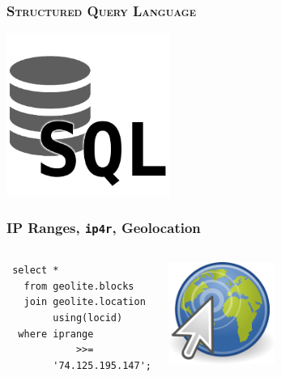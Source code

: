 \documentclass{beamer}
\begin{document}
\begin{frame}
  \frametitle{\textsc{Structured Query Language}}

  \begin{center}
    \includegraphics[height=2.1in]{sql.png}
  \end{center}
\end{frame}

\begin{frame}[fragile]
  \frametitle{IP Ranges, \texttt{ip4r}, Geolocation}

  \vfill

\begin{columns}
\begin{verbatim}
 select *
   from geolite.blocks
   join geolite.location
        using(locid)
  where iprange
            >>=
        '74.125.195.147';
\end{verbatim}
\begin{center}
  \includegraphics[height=9em]{geolocation-clic.png}
\end{center}
\end{columns}
\end{frame}
\end{document}
